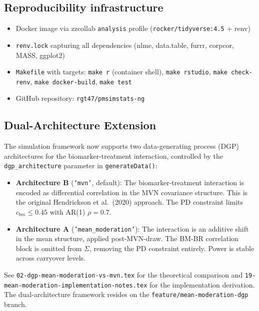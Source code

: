 \documentclass[11pt]{article}
\begin{document}
\subsection{Reproducibility infrastructure}

\begin{itemize}
  \item Docker image via zzcollab \texttt{analysis} profile
    (\texttt{rocker/tidyverse:4.5} + renv)
  \item \texttt{renv.lock} capturing all dependencies (nlme, data.table,
    furrr, corpcor, MASS, ggplot2)
  \item \texttt{Makefile} with targets: \texttt{make r} (container shell),
    \texttt{make rstudio}, \texttt{make check-renv}, \texttt{make docker-build},
    \texttt{make test}
  \item GitHub repository: \texttt{rgt47/pmsimstats-ng}
\end{itemize}

\subsection{Dual-Architecture Extension}

The simulation framework now supports two data-generating
process (DGP) architectures for the biomarker-treatment
interaction, controlled by the \texttt{dgp\_architecture}
parameter in \texttt{generateData()}:

\begin{itemize}
\item \textbf{Architecture B} (\texttt{'mvn'}, default):
  The biomarker-treatment interaction is encoded as
  differential correlation in the MVN covariance structure.
  This is the original Hendrickson et al.\ (2020) approach.
  The PD constraint limits $c_{bm} \leq 0.45$ with AR(1)
  $\rho = 0.7$.

\item \textbf{Architecture A} (\texttt{'mean\_moderation'}):
  The interaction is an additive shift in the mean structure,
  applied post-MVN-draw. The BM-BR correlation block is
  omitted from $\Sigma$, removing the PD constraint entirely.
  Power is stable across carryover levels.
\end{itemize}

See \texttt{02-dgp-mean-moderation-vs-mvn.tex} for the
theoretical comparison and
\texttt{19-mean-moderation-implementation-notes.tex} for the
implementation derivation. The dual-architecture framework
resides on the \texttt{feature/mean-moderation-dgp} branch.
\end{document}
